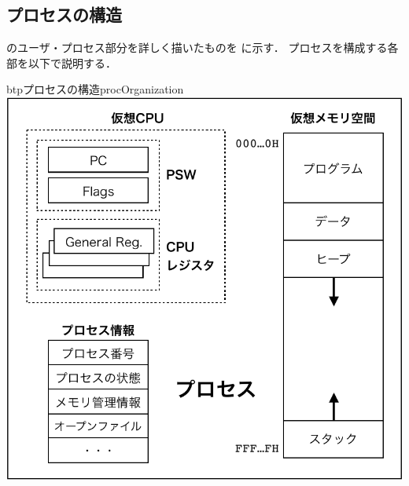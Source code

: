 \subsection{プロセスの構造}
のユーザ・プロセス部分を詳しく描いたものを
に示す．
プロセスを構成する各部を以下で説明する．

\begin{myfig}{btp}{プロセスの構造}{procOrganization}
  \includegraphics[scale=0.66]{Fig/procOrganization-crop.pdf}
\end{myfig}

